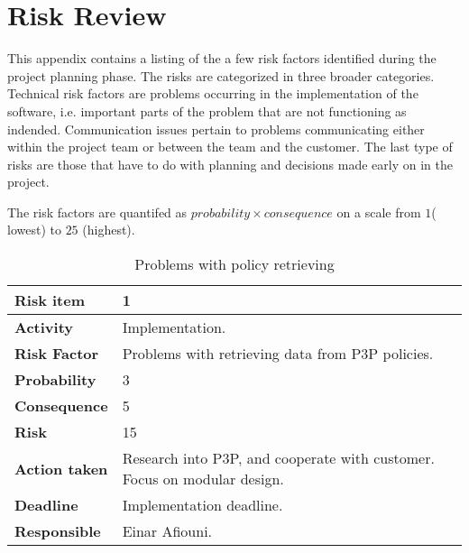 \chapter{Risk Review}\label{riskAppendix}

\minitoc


This appendix contains a listing of the a few risk factors identified during the project planning phase. The risks are categorized in three broader categories. Technical risk factors are problems occurring in the implementation of the software, i.e. important parts of the problem that are not functioning as indended. Communication issues pertain to problems communicating either within the project team or between the team and the customer. The last type of risks are those that have to do with planning and decisions made early on in the project.

The risk factors are quantifed as $probability \times consequence$ on a scale from $1$( lowest) to $25$ (highest).


\begin{table}[h!]

\begin{center}
\begin{tabularx}{\textwidth}{| X | X |}
\hline
\textbf{Risk item} & 1 \\
\hline
\textbf{Activity} & Implementation.  \\
\hline
\textbf{Risk Factor} & Problems with retrieving data from P3P policies. \\
\hline
\textbf{Probability} & 3 \\
\hline
\textbf{Consequence} & 5 \\
\hline
\textbf{Risk} & 15 \\
\hline
\textbf{Action taken} & Research into P3P, and cooperate with
customer. Focus on modular design. \\
\hline
\textbf{Deadline} & Implementation deadline. \\
\hline
\textbf{Responsible} & Einar Afiouni. \\
\hline
\end{tabularx}
\caption{Problems with policy retrieving}
\end{center}
\label{risk_3}
\end{table}

